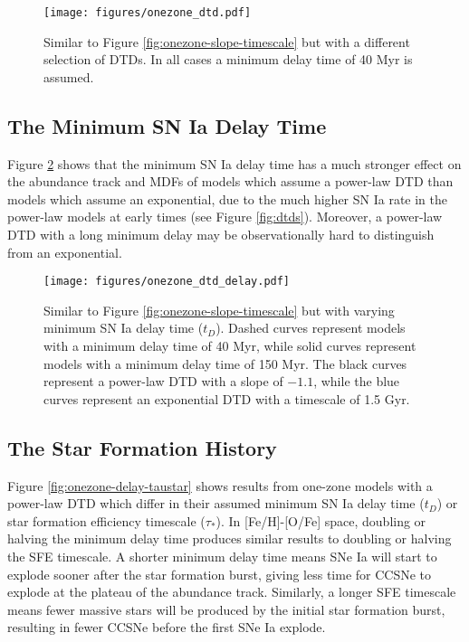 \documentclass[twocolumn]{aastex631}
\begin{document}
\begin{figure}
    \centering
    \texttt{[image: figures/onezone\_dtd.pdf]}
    \caption{Similar to Figure \ref{fig:onezone-slope-timescale} but with a different selection of DTDs. In all cases a minimum delay time of 40 Myr is assumed.}
    \label{fig:onezone-dtd}
\end{figure}

\subsection{The Minimum SN Ia Delay Time}

Figure \ref{fig:onezone-dtd-delay} shows that the minimum SN Ia delay time has a much stronger effect on the abundance track and MDFs of models which assume a power-law DTD than models which assume an exponential, due to the much higher SN Ia rate in the power-law models at early times (see Figure \ref{fig:dtds}). Moreover, a power-law DTD with a long minimum delay may be observationally hard to distinguish from an exponential. 

\begin{figure}
    \centering
    \texttt{[image: figures/onezone\_dtd\_delay.pdf]}
    \caption{Similar to Figure \ref{fig:onezone-slope-timescale} but with varying minimum SN Ia delay time ($t_D$). Dashed curves represent models with a minimum delay time of 40 Myr, while solid curves represent models with a minimum delay time of 150 Myr. The black curves represent a power-law DTD with a slope of $-1.1$, while the blue curves represent an exponential DTD with a timescale of 1.5 Gyr.}
    \label{fig:onezone-dtd-delay}
\end{figure}

\subsection{The Star Formation History}

Figure \ref{fig:onezone-delay-taustar} shows results from one-zone models with a power-law DTD which differ in their assumed minimum SN Ia delay time ($t_D$) or star formation efficiency timescale ($\tau_*$). In [Fe/H]-[O/Fe] space, doubling or halving the minimum delay time produces similar results to doubling or halving the SFE timescale. A shorter minimum delay time means SNe Ia will start to explode sooner after the star formation burst, giving less time for CCSNe to explode at the plateau of the abundance track. Similarly, a longer SFE timescale means fewer massive stars will be produced by the initial star formation burst, resulting in fewer CCSNe before the first SNe Ia explode. 
\end{document}
